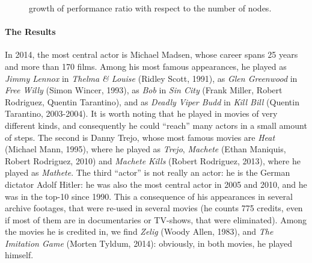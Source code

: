 \documentclass{acm_proc_article-sp}
\begin{document}
\begin{figure}
\centering
{}
\caption{growth of performance ratio with respect to the number of nodes.}
\label{fig:actorperformance}
\end{figure}

\paragraph{The Results} In 2014, the most central actor is Michael Madsen, whose career spans 25 years and more than 170 films. Among his most famous appearances, he played as \emph{Jimmy Lennox} in \emph{Thelma \& Louise} (Ridley Scott, 1991), as \emph{Glen Greenwood} in \emph{Free Willy} (Simon Wincer, 1993), as \emph{Bob} in \emph{Sin City} (Frank Miller, Robert Rodriguez, Quentin Tarantino), and as \emph{Deadly Viper Budd} in \emph{Kill Bill} (Quentin Tarantino, 2003-2004). It is worth noting that he played in movies of very different kinds, and consequently he could ``reach'' many actors in a small amount of steps.
The second is Danny Trejo, whose most famous movies are  \emph{Heat} (Michael Mann, 1995), where he played as \emph{Trejo}, \emph{Machete} (Ethan Maniquis, Robert Rodriguez, 2010) and \emph{Machete Kills} (Robert Rodriguez, 2013), where he played as \emph{Mathete}.
The third ``actor'' is not really an actor: he is the German dictator Adolf Hitler: he was also the most central actor in 2005 and 2010, and he was in the top-10 since 1990. This a consequence of his appearances in several archive footages, that were re-used in several movies (he counts 775 credits, even if most of them are in documentaries or TV-shows, that were eliminated). Among the movies he is credited in, we find \emph{Zelig} (Woody Allen, 1983), and \emph{The Imitation Game} (Morten Tyldum, 2014): obviously, in both movies, he played himself.
\end{document}
